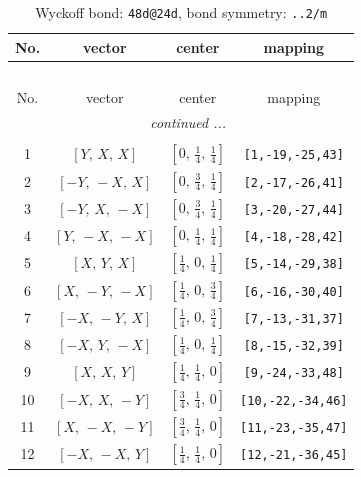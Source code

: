 \documentclass[fleqn,8pt]{jsarticle}
\begin{document}
\begin{longtable}{cccc}
\caption{Wyckoff bond: {\tt 48d@24d}, bond symmetry: {\tt ..2/m}}
 \\
 \hline \hline
No. & vector & center & mapping \\ \hline \endfirsthead

\multicolumn{3}{l}{\tablename\ \thetable{}} \\
 \hline \hline
No. & vector & center & mapping \\ \hline \endhead

 \hline \hline
\multicolumn{3}{r}{\footnotesize\it continued ...} \\ \endfoot

 \hline \hline
\multicolumn{3}{r}{} \\ \endlastfoot

1 & $\left[ Y,\, X,\, X \right]$ & $\left[ 0,\, \frac{1}{4},\, \frac{1}{4} \right]$ & {\tt [1,-19,-25,43]} \\ \hline
2 & $\left[ - Y,\, - X,\, X \right]$ & $\left[ 0,\, \frac{3}{4},\, \frac{1}{4} \right]$ & {\tt [2,-17,-26,41]} \\ \hline
3 & $\left[ - Y,\, X,\, - X \right]$ & $\left[ 0,\, \frac{3}{4},\, \frac{1}{4} \right]$ & {\tt [3,-20,-27,44]} \\ \hline
4 & $\left[ Y,\, - X,\, - X \right]$ & $\left[ 0,\, \frac{1}{4},\, \frac{1}{4} \right]$ & {\tt [4,-18,-28,42]} \\ \hline
5 & $\left[ X,\, Y,\, X \right]$ & $\left[ \frac{1}{4},\, 0,\, \frac{1}{4} \right]$ & {\tt [5,-14,-29,38]} \\ \hline
6 & $\left[ X,\, - Y,\, - X \right]$ & $\left[ \frac{1}{4},\, 0,\, \frac{3}{4} \right]$ & {\tt [6,-16,-30,40]} \\ \hline
7 & $\left[ - X,\, - Y,\, X \right]$ & $\left[ \frac{1}{4},\, 0,\, \frac{3}{4} \right]$ & {\tt [7,-13,-31,37]} \\ \hline
8 & $\left[ - X,\, Y,\, - X \right]$ & $\left[ \frac{1}{4},\, 0,\, \frac{1}{4} \right]$ & {\tt [8,-15,-32,39]} \\ \hline
9 & $\left[ X,\, X,\, Y \right]$ & $\left[ \frac{1}{4},\, \frac{1}{4},\, 0 \right]$ & {\tt [9,-24,-33,48]} \\ \hline
10 & $\left[ - X,\, X,\, - Y \right]$ & $\left[ \frac{3}{4},\, \frac{1}{4},\, 0 \right]$ & {\tt [10,-22,-34,46]} \\ \hline
11 & $\left[ X,\, - X,\, - Y \right]$ & $\left[ \frac{3}{4},\, \frac{1}{4},\, 0 \right]$ & {\tt [11,-23,-35,47]} \\ \hline
12 & $\left[ - X,\, - X,\, Y \right]$ & $\left[ \frac{1}{4},\, \frac{1}{4},\, 0 \right]$ & {\tt [12,-21,-36,45]} \\
\end{longtable}
\end{document}
